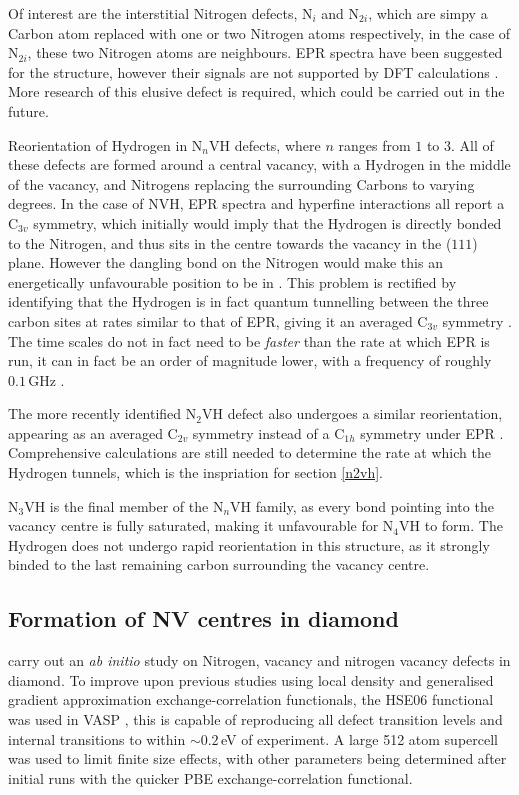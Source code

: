 \documentclass[10pt,a4paper,twocolumn,twoside]{extarticle}
\begin{document}
Of interest are the interstitial Nitrogen defects, N$_i$ and N$_{2i}$, which are simpy a Carbon atom replaced with one or two Nitrogen atoms respectively, in the case of N$_{2i}$, these two Nitrogen atoms are neighbours. EPR spectra have been suggested for the structure, however their signals are not supported by DFT calculations \cite{Atumi_2013}. More research of this elusive defect is required, which could be carried out in the future.

Reorientation of Hydrogen in N$_n$VH defects, where $n$ ranges from $1$ to $3$. All of these defects are formed around a central vacancy, with a Hydrogen in the middle of the vacancy, and Nitrogens replacing the surrounding Carbons to varying degrees. In the case of NVH, EPR spectra and hyperfine interactions all report a C$_{3v}$ symmetry, which initially would imply that the Hydrogen is directly bonded to the Nitrogen, and thus sits in the centre towards the vacancy in the ($1 1 1$) plane. However the dangling bond on the Nitrogen would make this an energetically unfavourable position to be in \cite{Goss_NVH}. This problem is rectified by identifying that the Hydrogen is in fact quantum tunnelling between the three carbon sites at rates similar to that of EPR, giving it an averaged C$_{3v}$ symmetry \cite{Shaw_QT_VH}. The time scales do not in fact need to be \emph{faster} than the rate at which EPR is run, it can in fact be an order of magnitude lower, with a frequency of roughly $0.1$\,GHz \cite{Edwards_N2VH_rate}.

The more recently identified N$_{2}$VH defect also undergoes a similar reorientation, appearing as an averaged C$_{2v}$ symmetry instead of a C$_{1h}$ symmetry under EPR \cite{Peaker}. Comprehensive calculations are still needed to determine the rate at which the Hydrogen tunnels, which is the inspriation for section \ref{n2vh}. 

N$_{3}$VH is the final member of the N$_{n}$VH family, as every bond pointing into the vacancy centre is fully saturated, making it unfavourable for N$_{4}$VH to form. The Hydrogen does not undergo rapid reorientation in this structure, as it strongly binded to the last remaining carbon surrounding the vacancy centre. 

\subsection{Formation of NV centres in diamond}
\textcite{Deak} carry out an \emph{ab initio} study on Nitrogen, vacancy and nitrogen vacancy defects in diamond. To improve upon previous studies using local density and generalised gradient approximation exchange-correlation functionals, the HSE$06$ functional \cite{HSE06} was used in VASP \cite{VASP}, this is capable of reproducing all defect transition levels and internal transitions to within $\sim0.2$\,eV of experiment. A large 512 atom supercell was used to limit finite size effects, with other parameters being determined after initial runs with the quicker PBE exchange-correlation functional. 
\end{document}
